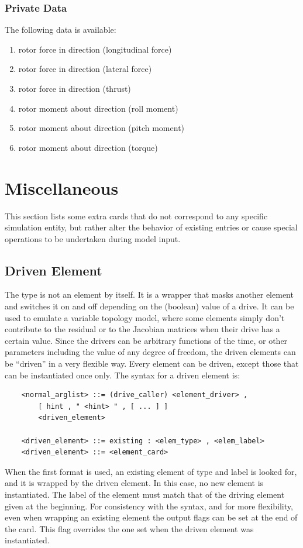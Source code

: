 \subsubsection{Private Data}
The following data is available:
\begin{enumerate}
\item {} rotor force in  direction (longitudinal force)
\item {} rotor force in  direction (lateral force)
\item {} rotor force in  direction (thrust)
\item {} rotor moment about  direction (roll moment)
\item {} rotor moment about  direction (pitch moment)
\item {} rotor moment about  direction (torque)
\end{enumerate}



\section{Miscellaneous}
This section lists some extra cards that do not correspond to any
specific simulation entity, but rather alter the behavior 
of existing entries or cause special operations to be undertaken
during model input.



\subsection{Driven Element}\label{sec:EL:BASE:DRIVEN}
The  type is not an element by itself. It is a wrapper that
masks another element and switches it on and off depending on the (boolean)
value of a drive. It can be used to emulate a variable topology model,
where some elements simply don't contribute to the residual
or to the Jacobian matrices when their drive has a certain value.
Since the drivers can be arbitrary functions of the time, 
or other parameters including the value of any degree of freedom, 
the driven elements can be ``driven'' in a very flexible way.
Every element can be driven, except those that can be instantiated once only.
The syntax for a driven element is:
\begin{verbatim}
    <normal_arglist> ::= (drive_caller) <element_driver> ,
        [ hint , " <hint> " , [ ... ] ]
        <driven_element>

    <driven_element> ::= existing : <elem_type> , <elem_label>
    <driven_element> ::= <element_card>
\end{verbatim}
When the first format is used, an existing element 
of type  and label  is looked for, 
and it is wrapped by the driven element.
In this case, no new element is instantiated.
The label of the element must match that of the driving element given 
at the beginning.
For consistency with the syntax, and for more flexibility, 
even when wrapping an existing element the output flags can be set
at the end of the card.
This flag overrides the one set when the driven element was instantiated.

